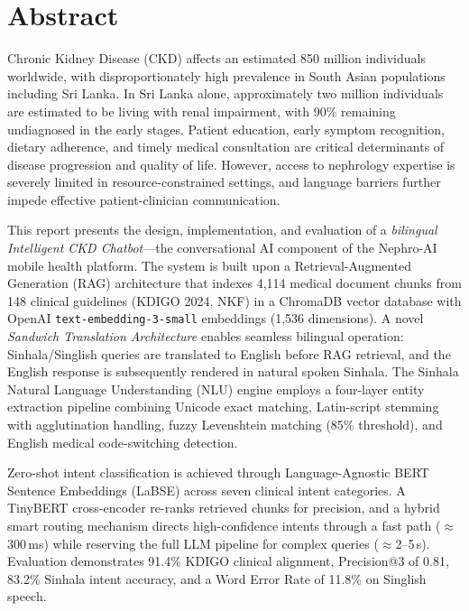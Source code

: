 \documentclass[12pt,a4paper]{report}
\begin{document}
\newpage
\chapter*{Abstract}

Chronic Kidney Disease (CKD) affects an estimated 850 million individuals worldwide, with disproportionately high prevalence in South Asian populations including Sri Lanka. In Sri Lanka alone, approximately two million individuals are estimated to be living with renal impairment, with 90\% remaining undiagnosed in the early stages. Patient education, early symptom recognition, dietary adherence, and timely medical consultation are critical determinants of disease progression and quality of life. However, access to nephrology expertise is severely limited in resource-constrained settings, and language barriers further impede effective patient-clinician communication.

This report presents the design, implementation, and evaluation of a \emph{bilingual Intelligent CKD Chatbot}---the conversational AI component of the Nephro-AI mobile health platform. The system is built upon a Retrieval-Augmented Generation (RAG) architecture that indexes 4,114 medical document chunks from 148 clinical guidelines (KDIGO 2024, NKF) in a ChromaDB vector database with OpenAI \texttt{text-embedding-3-small} embeddings (1,536 dimensions). A novel \emph{Sandwich Translation Architecture} enables seamless bilingual operation: Sinhala/Singlish queries are translated to English before RAG retrieval, and the English response is subsequently rendered in natural spoken Sinhala. The Sinhala Natural Language Understanding (NLU) engine employs a four-layer entity extraction pipeline combining Unicode exact matching, Latin-script stemming with agglutination handling, fuzzy Levenshtein matching (85\% threshold), and English medical code-switching detection.

Zero-shot intent classification is achieved through Language-Agnostic BERT Sentence Embeddings (LaBSE) across seven clinical intent categories. A TinyBERT cross-encoder re-ranks retrieved chunks for precision, and a hybrid smart routing mechanism directs high-confidence intents through a fast path ($\approx$300\,ms) while reserving the full LLM pipeline for complex queries ($\approx$2--5\,s). Evaluation demonstrates 91.4\% KDIGO clinical alignment, Precision@3 of 0.81, 83.2\% Sinhala intent accuracy, and a Word Error Rate of 11.8\% on Singlish speech.
\end{document}
